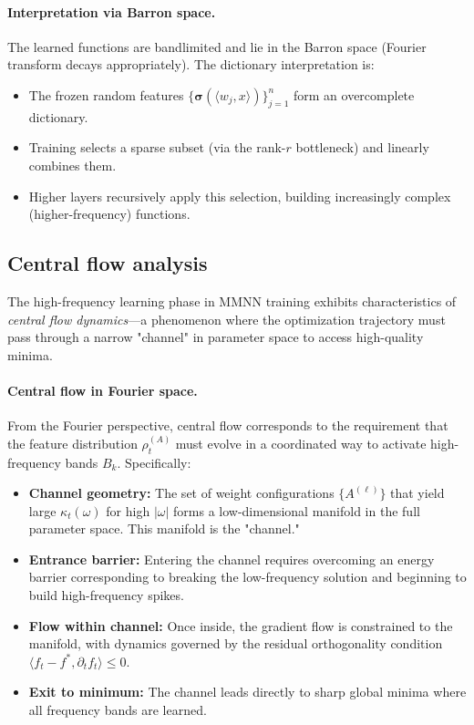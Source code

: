 \documentclass{article}
\DeclareRobustCommand{\ReLU}{\mathrel{\boldsymbol{\sigma}}}
\begin{document}
\paragraph{Interpretation via Barron space.}
The learned functions are bandlimited and lie in the Barron space (Fourier transform decays appropriately). The dictionary interpretation is:
\begin{itemize}
    \item The frozen random features \( \{\ReLU(\langle w_j, x \rangle)\}_{j=1}^n \) form an overcomplete dictionary.
    \item Training selects a sparse subset (via the rank-\( r \) bottleneck) and linearly combines them.
    \item Higher layers recursively apply this selection, building increasingly complex (higher-frequency) functions.
\end{itemize}

\vspace{1em}
\subsection{Central flow analysis}
The high-frequency learning phase in MMNN training exhibits characteristics of \emph{central flow dynamics}—a phenomenon where the optimization trajectory must pass through a narrow "channel" in parameter space to access high-quality minima.

\paragraph{Central flow in Fourier space.}
From the Fourier perspective, central flow corresponds to the requirement that the feature distribution \( \rho_t^{(A)} \) must evolve in a coordinated way to activate high-frequency bands \( B_k \). Specifically:
\begin{itemize}
    \item \textbf{Channel geometry:} The set of weight configurations \( \{A^{(\ell)}\} \) that yield large \( \kappa_t(\omega) \) for high \( |\omega| \) forms a low-dimensional manifold in the full parameter space. This manifold is the "channel."
    \item \textbf{Entrance barrier:} Entering the channel requires overcoming an energy barrier corresponding to breaking the low-frequency solution and beginning to build high-frequency spikes.
    \item \textbf{Flow within channel:} Once inside, the gradient flow is constrained to the manifold, with dynamics governed by the residual orthogonality condition \( \langle f_t - f^*, \partial_t f_t \rangle \leq 0 \).
    \item \textbf{Exit to minimum:} The channel leads directly to sharp global minima where all frequency bands are learned.
\end{itemize}
\end{document}
